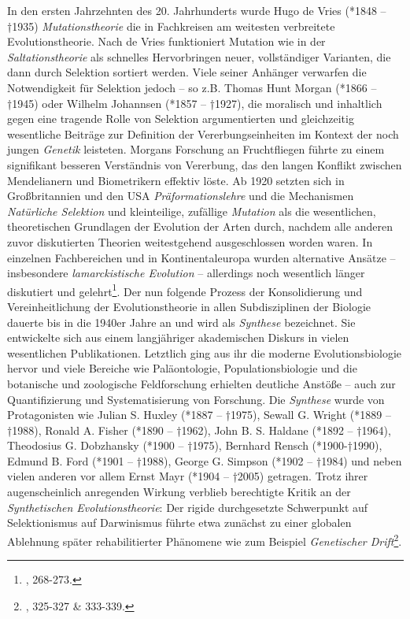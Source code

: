 \documentclass[openany,twoside,twocolumn]{book}
\let\rmarkdownfootnote\footnote%
\def\footnote{\protect\rmarkdownfootnote}
\begin{document}
In den ersten Jahrzehnten des 20. Jahrhunderts wurde Hugo de Vries (*1848 -- †1935) \emph{Mutationstheorie} die in Fachkreisen am weitesten verbreitete Evolutionstheorie. Nach de Vries funktioniert Mutation wie in der \emph{Saltationstheorie} als schnelles Hervorbringen neuer, vollständiger Varianten, die dann durch Selektion sortiert werden. Viele seiner Anhänger verwarfen die Notwendigkeit für Selektion jedoch -- so z.B. Thomas Hunt Morgan (*1866 -- †1945) oder Wilhelm Johannsen (*1857 -- †1927), die moralisch und inhaltlich gegen eine tragende Rolle von Selektion argumentierten und gleichzeitig wesentliche Beiträge zur Definition der Vererbungseinheiten im Kontext der noch jungen \emph{Genetik} leisteten. Morgans Forschung an Fruchtfliegen führte zu einem signifikant besseren Verständnis von Vererbung, das den langen Konflikt zwischen Mendelianern und Biometrikern effektiv löste. Ab 1920 setzten sich in Großbritannien und den USA \emph{Präformationslehre} und die Mechanismen \emph{Natürliche Selektion} und kleinteilige, zufällige \emph{Mutation} als die wesentlichen, theoretischen Grundlagen der Evolution der Arten durch, nachdem alle anderen zuvor diskutierten Theorien weitestgehend ausgeschlossen worden waren. In einzelnen Fachbereichen und in Kontinentaleuropa wurden alternative Ansätze -- insbesondere \emph{lamarckistische Evolution} -- allerdings noch wesentlich länger diskutiert und gelehrt\footnote{\textcite{bowler_evolution_1989}, 268-273.}. Der nun folgende Prozess der Konsolidierung und Vereinheitlichung der Evolutionstheorie in allen Subdisziplinen der Biologie dauerte bis in die 1940er Jahre an und wird als \emph{Synthese} bezeichnet. Sie entwickelte sich aus einem langjähriger akademischen Diskurs in vielen wesentlichen Publikationen. Letztlich ging aus ihr die moderne Evolutionsbiologie hervor und viele Bereiche wie Paläontologie, Populationsbiologie und die botanische und zoologische Feldforschung erhielten deutliche Anstöße -- auch zur Quantifizierung und Systematisierung von Forschung. Die \emph{Synthese} wurde von Protagonisten wie Julian S. Huxley (*1887 -- †1975), Sewall G. Wright (*1889 -- †1988), Ronald A. Fisher (*1890 -- †1962), John B. S. Haldane (*1892 -- †1964), Theodosius G. Dobzhansky (*1900 -- †1975), Bernhard Rensch (*1900-†1990), Edmund B. Ford (*1901 -- †1988), George G. Simpson (*1902 -- †1984) und neben vielen anderen vor allem Ernst Mayr (*1904 -- †2005) getragen. Trotz ihrer augenscheinlich anregenden Wirkung verblieb berechtigte Kritik an der \emph{Synthetischen Evolutionstheorie}: Der rigide durchgesetzte Schwerpunkt auf Selektionismus auf Darwinismus führte etwa zunächst zu einer globalen Ablehnung später rehabilitierter Phänomene wie zum Beispiel \emph{Genetischer Drift}\footnote{\textcite{bowler_evolution_1989}, 325-327 \& 333-339.}.
\end{document}
